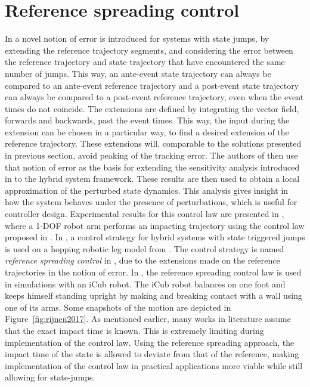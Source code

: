 \documentclass[../DC2017114Bouma.tex]{subfiles}
\begin{document}
\section{Reference spreading control}
In \cite{Saccon2014,Rijnen2015} a novel notion of error is introduced for systems with state jumps, by extending the reference trajectory segments, and considering the error between the reference trajectory and state trajectory that have encountered the same number of jumps. This way, an ante-event state trajectory can always be compared to an ante-event reference trajectory and a post-event state trajectory can always be compared to a post-event reference trajectory, even when the event times do not coincide. The extensions are defined by integrating the vector field, forwards and backwards, past the event times. This way, the input during the extension can be chosen in a particular way, to find a desired extension of the reference trajectory. These extensions will, comparable to the solutions presented in previous section, avoid peaking of the tracking error. The authors of \cite{Saccon2014,Rijnen2015} then use that notion of error as the basis for extending the sensitivity analysis introduced in \cite{Khalil1996} to the hybrid system framework. These results are then used to obtain a local approximation of the perturbed state dynamics. This analysis gives insight in how the system behaves under the presence of perturbations, which is useful for controller design. Experimental results for this control law are presented in \cite{Incremona2015}, where a 1-DOF robot arm performs an impacting trajectory using the control law proposed in \cite{Saccon2014}. In \cite{Rijnen2016}, a control strategy for hybrid systems with state triggered jumps is used on a hopping robotic leg model from \cite{Tsagarakis2013}. The control strategy is named \textit{reference spreading control} in \cite{Rijnen2017}, due to the extensions made on the reference trajectories in the notion of error. In \cite{Rijnen2017a}, the reference spreading control law is used in simulations with an iCub robot. The iCub robot balances on one foot and keeps himself standing upright by making and breaking contact with a wall using one of its arms. Some snapshots of the motion are depicted in Figure~\ref{fig:rijnen2017}. As mentioned earlier, many works in literature assume that the exact impact time is known. This is extremely limiting during implementation of the control law. Using the reference spreading approach, the impact time of the state is allowed to deviate from that of the reference, making implementation of the control law in practical applications more viable while still allowing for state-jumps.
\end{document}
